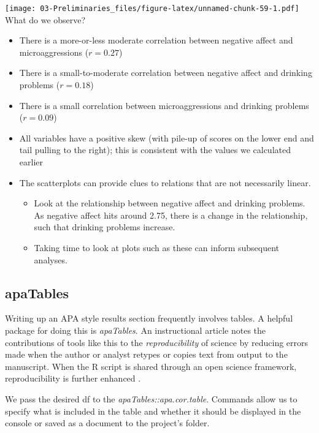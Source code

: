 \documentclass[
  11pt,
]{book}
\providecommand{\tightlist}{%
  \setlength{\itemsep}{0pt}\setlength{\parskip}{0pt}}
\begin{document}
\texttt{[image: 03-Preliminaries\_files/figure-latex/unnamed-chunk-59-1.pdf]} What do we observe?

\begin{itemize}
\tightlist
\item
  There is a more-or-less moderate correlation between negative affect and microaggressions (\(r = 0.27\))
\item
  There is a small-to-moderate correlation between negative affect and drinking problems (\(r = 0.18\))
\item
  There is a small correlation between microaggressions and drinking problems (\(r = 0.09\))
\item
  All variables have a positive skew (with pile-up of scores on the lower end and tail pulling to the right); this is consistent with the values we calculated earlier
\item
  The scatterplots can provide clues to relations that are not necessarily linear.

  \begin{itemize}
  \tightlist
  \item
    Look at the relationship between negative affect and drinking problems. As negative affect hits around 2.75, there is a change in the relationship, such that drinking problems increase.
  \item
    Taking time to look at plots such as these can inform subsequent analyses.
  \end{itemize}
\end{itemize}

\hypertarget{apatables}{%
\subsection{apaTables}\label{apatables}}

Writing up an APA style results section frequently involves tables. A helpful package for doing this is \emph{apaTables}. An instructional article notes the contributions of tools like this to the \emph{reproducibility} of science by reducing errors made when the author or analyst retypes or copies text from output to the manuscript. When the R script is shared through an open science framework, reproducibility is further enhanced \citep{stanley_reproducible_2018}.

We pass the desired df to the \emph{apaTables::apa.cor.table}. Commands allow us to specify what is included in the table and whether it should be displayed in the console or saved as a document to the project's folder.
\end{document}
